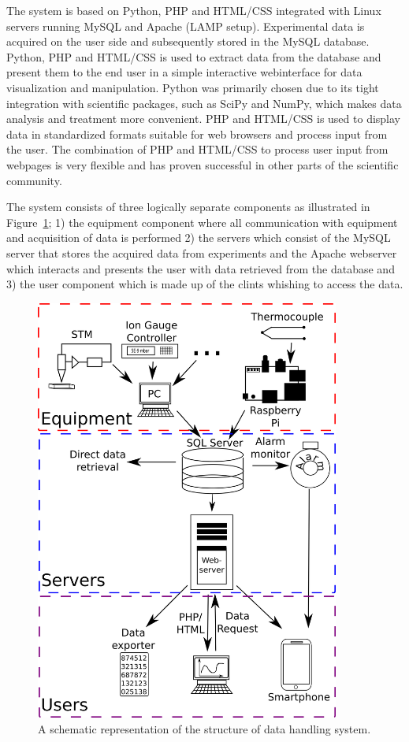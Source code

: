 The system is based on Python, PHP and HTML/CSS integrated with Linux
servers running MySQL and Apache (LAMP setup). Experimental data is
acquired on the user side and subsequently stored in the MySQL
database. Python, PHP and HTML/CSS is used to extract data from the
database and present them to the end user in a simple interactive
webinterface for data visualization and manipulation. Python was
primarily chosen due to its tight integration with scientific
packages, such as SciPy and NumPy, which makes data analysis and
treatment more convenient\cite{Cahn2007}. PHP and HTML/CSS is used to
display data in standardized formats suitable for web browsers and
process input from the user. The combination of PHP and HTML/CSS to
process user input from webpages is very flexible and has proven
successful in other parts of the scientific community\cite{Crane2008}.

The system consists of three logically separate components as illustrated in
Figure~\ref{fig:system_overview}; 1) the equipment component where all
communication with equipment and acquisition of data is performed 2) the
servers which consist of the MySQL server that stores the acquired data from
experiments and the Apache webserver which interacts and presents the user with data
retrieved from the database and 3) the user component which is made up of the
clints whishing to access the data. \begin{figure}
 \begin{center}
 \includegraphics[width=10cm]{system_overview.png}
 \caption{
   A schematic representation of the structure of data handling system.
   \label{fig:system_overview}
 } 
 \end{center}
\end{figure}

